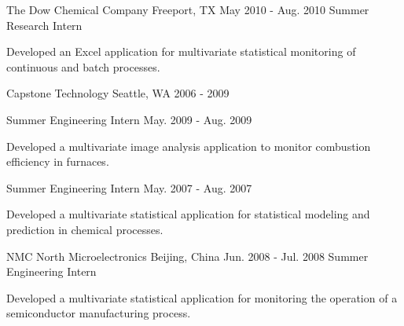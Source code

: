 

\begin{cventries}
\cventry
{The Dow Chemical Company} %
{Freeport, TX} %
{May 2010 - Aug. 2010} %
{Summer Research Intern} %
{
\begin{cvitems} %
\item {Developed an Excel application for multivariate statistical monitoring of continuous and batch processes.}
\end{cvitems}
}
\cvmultientry
{Capstone Technology} %
{Seattle, WA}
{2006 - 2009} %
{
\cvsubentry
{Summer Engineering Intern} %
{} %
{May. 2009 - Aug. 2009} %
{
\begin{cvitems} %
\item {Developed a multivariate image analysis application to monitor combustion efficiency in furnaces.}
\end{cvitems}
}
\cvsubentry
{Summer Engineering Intern} %
{} %
{May. 2007 - Aug. 2007} %
{
\begin{cvitems} %
\item {Developed a multivariate statistical application for statistical modeling and prediction in chemical processes.}
\end{cvitems}
}

}

\cventry
{NMC North Microelectronics} %
{Beijing, China} %
{Jun. 2008 - Jul. 2008} %
{Summer Engineering Intern} %
{
\begin{cvitems} %
\item {Developed a multivariate statistical application for monitoring the operation of a semiconductor manufacturing process.}
\end{cvitems}
}
\end{cventries}

